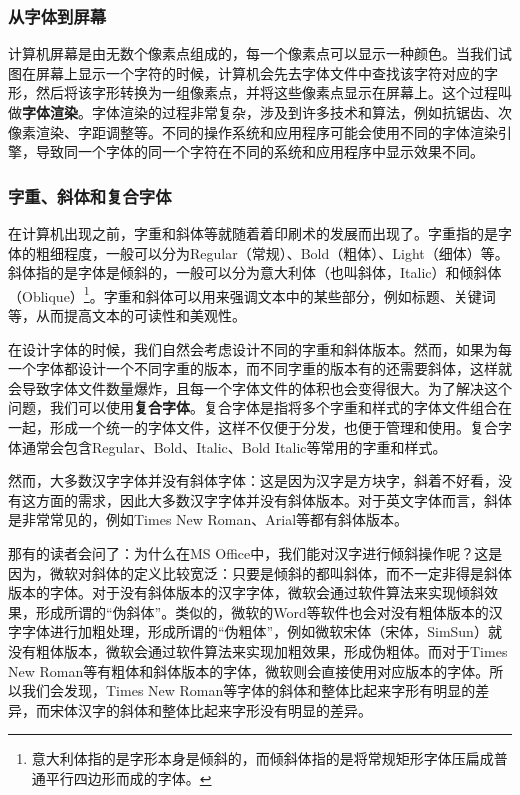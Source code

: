 \subsubsection{从字体到屏幕}

计算机屏幕是由无数个像素点组成的，每一个像素点可以显示一种颜色。当我们试图在屏幕上显示一个字符的时候，计算机会先去字体文件中查找该字符对应的字形，然后将该字形转换为一组像素点，并将这些像素点显示在屏幕上。这个过程叫做\textbf{字体渲染}。字体渲染的过程非常复杂，涉及到许多技术和算法，例如抗锯齿、次像素渲染、字距调整等。不同的操作系统和应用程序可能会使用不同的字体渲染引擎，导致同一个字体的同一个字符在不同的系统和应用程序中显示效果不同。

\subsubsection{字重、斜体和复合字体}

在计算机出现之前，字重和斜体等就随着着印刷术的发展而出现了。字重指的是字体的粗细程度，一般可以分为Regular（常规）、Bold（粗体）、Light（细体）等。斜体指的是字体是倾斜的，一般可以分为意大利体（也叫斜体，Italic）和倾斜体（Oblique）\footnote{意大利体指的是字形本身是倾斜的，而倾斜体指的是将常规矩形字体压扁成普通平行四边形而成的字体。}。字重和斜体可以用来强调文本中的某些部分，例如标题、关键词等，从而提高文本的可读性和美观性。

在设计字体的时候，我们自然会考虑设计不同的字重和斜体版本。然而，如果为每一个字体都设计一个不同字重的版本，而不同字重的版本有的还需要斜体，这样就会导致字体文件数量爆炸，且每一个字体文件的体积也会变得很大。为了解决这个问题，我们可以使用\textbf{复合字体}。复合字体是指将多个字重和样式的字体文件组合在一起，形成一个统一的字体文件，这样不仅便于分发，也便于管理和使用。复合字体通常会包含Regular、Bold、Italic、Bold Italic等常用的字重和样式。

然而，大多数汉字字体并没有斜体字体：这是因为汉字是方块字，斜着不好看，没有这方面的需求，因此大多数汉字字体并没有斜体版本。对于英文字体而言，斜体是非常常见的，例如Times New Roman、Arial等都有斜体版本。

那有的读者会问了：为什么在MS Office中，我们能对汉字进行倾斜操作呢？这是因为，微软对斜体的定义比较宽泛：只要是倾斜的都叫斜体，而不一定非得是斜体版本的字体。对于没有斜体版本的汉字字体，微软会通过软件算法来实现倾斜效果，形成所谓的“伪斜体”。类似的，微软的Word等软件也会对没有粗体版本的汉字字体进行加粗处理，形成所谓的“伪粗体”，例如微软宋体（宋体，SimSun）就没有粗体版本，微软会通过软件算法来实现加粗效果，形成伪粗体。而对于Times New Roman等有粗体和斜体版本的字体，微软则会直接使用对应版本的字体。所以我们会发现，Times New Roman等字体的斜体和整体比起来字形有明显的差异，而宋体汉字的斜体和整体比起来字形没有明显的差异。

